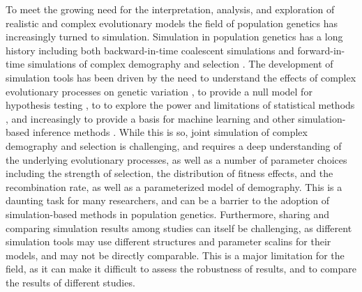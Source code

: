 \documentclass[hidelinks]{article}
\begin{document}
    To meet the growing need for the interpretation,
    analysis, and exploration of realistic and complex evolutionary models
    the field of population genetics has increasingly turned to simulation.
    Simulation in population genetics has a long history 
    including both backward-in-time coalescent simulations
    \citep{kingman1982genealogy,hudson1983testing, hudson1990gene}
    and forward-in-time simulations of complex demography and selection
    \citep[e.g.,][]{gillespie1984molecular,thornton2014c++, haller2019slim}.
    The development of simulation tools has been driven by the need to
    understand the effects of complex evolutionary processes on genetic
    variation \citep[e.g.,][]{galloway2020few}, to provide a null model for hypothesis testing
    \citep[e.g.,][]{hudson1992statistical,hudson1994evidence,sabeti2002detecting}, to
    to explore the power and limitations of statistical methods \cite[e.g.,][]{przeworski2002signature},
    and increasingly to provide a basis for machine learning and other
    simulation-based inference methods \citep[e.g.,][]{pavlidis2010searching,lin2011distinguishing,kern2018diplos,mughal2019localizing,sanchez2021deep,wang2021automatic}.
    While this is so, joint simulation of complex demography and selection
    is challenging, and requires a deep understanding of the underlying
    evolutionary processes, as well as a number of parameter choices including
    the strength of selection, the distribution of fitness effects, and the
    recombination rate, as well as a parameterized model of demography.
    This is a daunting task for many researchers, and can be a barrier to
    the adoption of simulation-based methods in population genetics.
    Furthermore, sharing and comparing simulation results among studies can 
    itself be challenging, as different simulation tools may use different structures
    and parameter scalins for their models, and may not be directly comparable.
    This is a major limitation for the field, as it can make it difficult
    to assess the robustness of results, and to compare the results of
    different studies.
\end{document}
